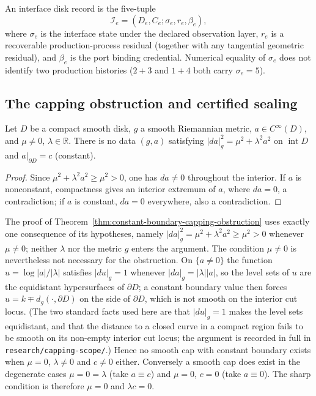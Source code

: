\begin{definition}
\label{def:interface-record-with-residual}
An interface disk record is the five-tuple
\[
  \mathcal I_e=(D_e,C_e;\sigma_e,r_e,\beta_e),
\]
where $\sigma_e$ is the interface state under the declared observation layer,
$r_e$ is a recoverable production-process residual (together with any tangential
geometric residual), and $\beta_e$ is the port binding credential.  Numerical
equality of $\sigma_e$ does not identify two production histories ($2+3$ and
$1+4$ both carry $\sigma_e=5$).
\end{definition}

\subsection{The capping obstruction and certified sealing}

\begin{theorem}
\label{thm:constant-boundary-capping-obstruction}
Let $D$ be a compact smooth disk, $g$ a smooth Riemannian metric, $a\in C^\infty(D)$,
and $\mu\ne0$, $\lambda\in\mathbb R$.  There is no data $(g,a)$ satisfying
$|da|_g^2=\mu^2+\lambda^2 a^2$ on $\operatorname{int}D$ and $a|_{\partial D}=c$
(constant).
\end{theorem}

\begin{proof}
Since $\mu^2+\lambda^2a^2\ge\mu^2>0$, one has $da\ne0$ throughout the interior.
If $a$ is nonconstant, compactness gives an interior extremum of $a$, where
$da=0$, a contradiction; if $a$ is constant, $da=0$ everywhere, also a
contradiction.
\end{proof}

\begin{remark}
\label{rem:capping-scope-mu-essential}
The proof of Theorem~\ref{thm:constant-boundary-capping-obstruction} uses exactly
one consequence of its hypotheses, namely $|da|_g^2=\mu^2+\lambda^2a^2\ge\mu^2>0$
whenever $\mu\ne0$; neither $\lambda$ nor the metric $g$ enters the argument.  The
condition $\mu\ne0$ is nevertheless not necessary for the obstruction.  On
$\{a\ne0\}$ the function $u=\log|a|/|\lambda|$ satisfies $|du|_g=1$ whenever
$|da|_g=|\lambda||a|$, so the level sets of $u$ are the equidistant hypersurfaces
of $\partial D$; a constant boundary value then forces
$u=k\mp d_g(\cdot,\partial D)$ on the side of $\partial D$, which is not smooth on
the interior cut locus.  (The two standard facts used here are that $|du|_g=1$
makes the level sets equidistant, and that the distance to a closed curve in a
compact region fails to be smooth on its non-empty interior cut locus; the
argument is recorded in full in \texttt{research/capping-scope/}.)  Hence no
smooth cap with constant boundary exists when
$\mu=0$, $\lambda\ne0$ and $c\ne0$ either.  Conversely a smooth cap does exist in
the degenerate cases $\mu=0=\lambda$ (take $a\equiv c$) and $\mu=0$, $c=0$ (take
$a\equiv0$).  The sharp condition is therefore $\mu=0$ and $\lambda c=0$.
\end{remark}

